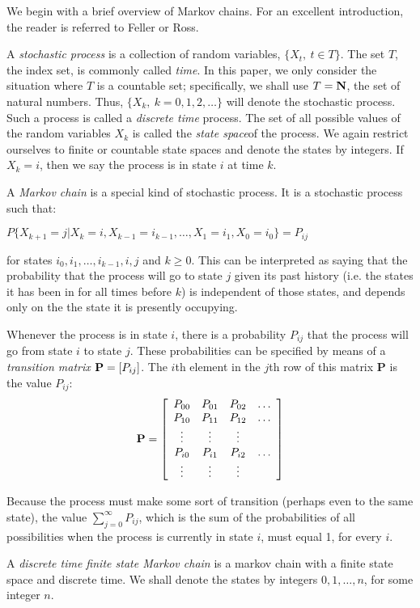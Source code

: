 
We begin with a brief overview of Markov chains. For an excellent
introduction, the reader is referred to Feller\cite{feller} or
Ross\cite{rosstext}. 

A {\em stochastic process\/} is a collection of random  variables,
$\{X_t,\ t\in T\}$.  The set $T$, the index set, is commonly
called {\em time\/}.  In this paper, we only  consider the situation
where $T$ is a countable set; specifically, we shall use $T={\bf N}$,
the set of natural numbers. Thus,  
$\{X_k,\ k=0,1,2,\ldots\}$ will denote the stochastic process. 
Such a process is called a {\em discrete time\/} process.
The set of all possible values of the random variables $X_k$ is called
the {\em state space\/}of the process.  We again restrict ourselves to
finite or countable state spaces and denote the states by integers. If
$X_{k}=i$, then we say the process is in state $i$ at time $k$.  

A {\em Markov chain\/} is a special kind of stochastic process.
It is a stochastic process such that:
\begin{center}
$P\{X_{k+1}=j|X_{k}=i, X_{k-1}=i_{k-1}, \ldots,X_{1}=i_{1},
X_{0}=i_{0}\}=P_{ij}$ 
\end{center}
for states $i_{0},i_{1}, \ldots,i_{k-1},i,j$ and $k \geq 0$.  This can
be interpreted as saying that the probability that the process will go
to state $j$ given its past history (i.e. the states it has been in
for all times before $k$) is independent of those states, and depends
only on the the state it is presently occupying.

Whenever the process is in state $i$, there is a probability $P_{ij}$
that the process will go from state $i$ to state $j$. These
probabilities can be specified by means of a {\em transition matrix\/}
${\bf P}=[P_{ij}]$. The $i$th element in the $j$th row of this matrix
{\bf P} is the value $P_{ij}$: 
$$
{\bf P} = \left[ \begin{array}{cccc}
			P_{00} & P_{01} & P_{02} & \ldots \\
			P_{10} & P_{11} & P_{12} & \ldots \\
			\vdots & \vdots & \vdots &        \\
			P_{i0} & P_{i1} & P_{i2} & \ldots \\
			\vdots & \vdots & \vdots &        
			\end{array} \right]
$$

Because the process must make some sort of transition (perhaps even to
the same state), the value $\sum_{j=0}^{\infty} P_{ij}$, which is the
sum of the probabilities of all possibilities when the process is
currently in state $i$, must equal 1, for every $i$.  

A {\em discrete time finite state Markov chain} is a markov chain with a
finite state space and discrete time. We shall denote the states by
integers $0,1,\ldots,n$, for some integer $n$. 
